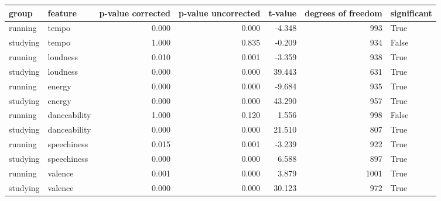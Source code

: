 \begin{tabular}{llrrrrl}
\toprule
   group &      feature &  p-value corrected &  p-value uncorrected &  t-value &  degrees of freedom &  significant \\
\midrule
 running &        tempo &              0.000 &                0.000 &   -4.348 &                 993 &         True \\
studying &        tempo &              1.000 &                0.835 &   -0.209 &                 934 &        False \\
 running &     loudness &              0.010 &                0.001 &   -3.359 &                 938 &         True \\
studying &     loudness &              0.000 &                0.000 &   39.443 &                 631 &         True \\
 running &       energy &              0.000 &                0.000 &   -9.684 &                 935 &         True \\
studying &       energy &              0.000 &                0.000 &   43.290 &                 957 &         True \\
 running & danceability &              1.000 &                0.120 &    1.556 &                 998 &        False \\
studying & danceability &              0.000 &                0.000 &   21.510 &                 807 &         True \\
 running &  speechiness &              0.015 &                0.001 &   -3.239 &                 922 &         True \\
studying &  speechiness &              0.000 &                0.000 &    6.588 &                 897 &         True \\
 running &      valence &              0.001 &                0.000 &    3.879 &                1001 &         True \\
studying &      valence &              0.000 &                0.000 &   30.123 &                 972 &         True \\
\bottomrule
\end{tabular}
